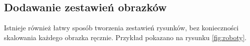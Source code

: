 \documentclass[12pt,a4paper]{article}
\begin{document}
\subsection{Dodawanie zestawień obrazków}
Istnieje również łatwy sposób tworzenia zestawień rysunków, bez konieczności skalowania każdego obrazka ręcznie. Przykład pokazano na rysunku \ref{fig:roboty}.
%
\begin{figure}[tp]
\centering

    \hspace{0.4cm}


    \hspace{0.4cm}


\end{figure}
\end{document}
